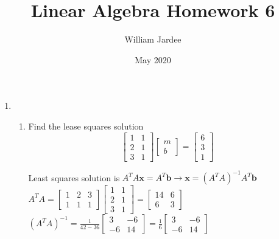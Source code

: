 \documentclass{article}
\title{Linear Algebra Homework 6}
\author{William Jardee}
\date{May 2020}
\begin{document}
\maketitle

\begin{enumerate}


\item 
\begin{enumerate}
    \item Find the lease squares solution\\
    $$\begin{bmatrix}
        1 & 1 \\
        2 & 1 \\
        3 & 1
    \end{bmatrix}
    \begin{bmatrix}
         m  \\
         b 
    \end{bmatrix} = 
    \begin{bmatrix}
         6  \\
         3  \\
         1
    \end{bmatrix}$$
    
    Least squares solution is $A^TA\textbf{x} = A^T\textbf{b} \rightarrow \textbf{x} = (A^TA)^{-1}A^T\textbf{b}$\\
    $A^TA = \begin{bmatrix}1&2&3\\1&1&1\end{bmatrix}
    \begin{bmatrix}1&1\\2&1\\3&1\end{bmatrix} =
    \begin{bmatrix}14&6\\6&3\end{bmatrix}$\\
    $(A^TA)^{-1} = \frac{1}{42-36}\begin{bmatrix}3&-6\\-6&14\end{bmatrix}=
    \frac{1}{6}\begin{bmatrix}3&-6\\-6&14\end{bmatrix}$\\
    

\end{enumerate}
\end{enumerate}
\end{document}

